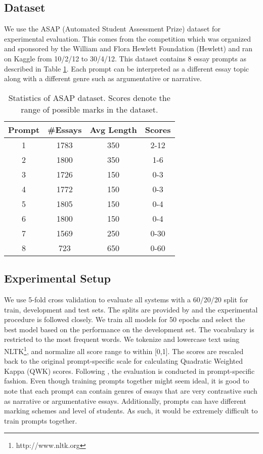 \documentclass[letterpaper]{article}
\begin{document}
\subsection{Dataset}
We use the ASAP (Automated Student Assessment Prize) dataset for experimental evaluation. This comes from the competition which was organized and sponsored by the William and Flora Hewlett Foundation (Hewlett) and ran on Kaggle from 10/2/12 to 30/4/12. This dataset contains 8 essay prompts as described in Table \ref{tab:asap}. Each prompt can be interpreted as a different essay topic along with a different genre such as argumentative or narrative. 
\begin{table}[htbp]
   \centering
\small
     \begin{tabular}{|c|c|c|c|}
     \hline
     Prompt & \#Essays & Avg Length & Scores \\
     \hline
     1     & 1783  & 350   & 2-12 \\
     2     & 1800  & 350   &  1-6 \\
     3     & 1726  & 150   &  0-3 \\
     4     & 1772  & 150   &  0-3 \\
     5     & 1805  & 150   &  0-4\\
     6     & 1800  & 150   &  0-4\\
     7     & 1569  & 250   &  0-30\\
     8     & 723   & 650   &  0-60\\
     \hline
     \end{tabular}\caption{Statistics of ASAP dataset. Scores denote the range of possible marks in the dataset. }
   \label{tab:asap}\end{table}

\subsection{Experimental Setup}
 We use 5-fold cross validation to evaluate all systems with a 60/20/20 split for train, development and test sets. The splits are provided by \cite{DBLP:conf/emnlp/TaghipourN16} and the experimental procedure is followed closely. We train all models for 50 epochs and select the best model based on the performance on the development set. The vocabulary is restricted to the  most frequent words.  We tokenize and lowercase text using NLTK\footnote{http://www.nltk.org}, and normalize all score range to within [0,1]. The scores are rescaled back to the original prompt-specific scale for calculating Quadratic Weighted Kappa (QWK) scores. Following \cite{DBLP:conf/emnlp/TaghipourN16}, the evaluation is conducted in prompt-specific fashion. Even though training prompts together might seem ideal, it is good to note that each prompt can contain genres of essays that are very contrastive such as narrative or argumentative essays. Additionally, prompts can have different marking schemes and level of students. As such, it would be extremely difficult to train prompts together. 
\end{document}
